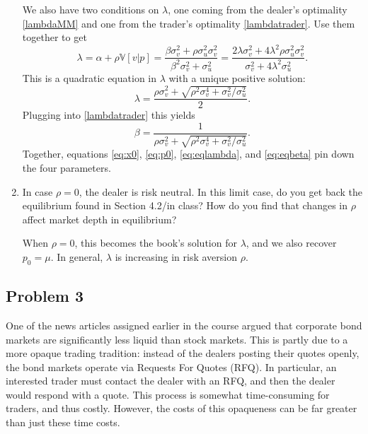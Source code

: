 \documentclass[11pt
, answers
]{exam}
\begin{document}
\begin{enumerate}[label=(\alph*). ]
\begin{solution}
We also have two conditions on $\lambda$, one coming from the dealer's optimality \eqref{lambdaMM} and one from the trader's optimality \eqref{lambdatrader}. Use them together to get
\[
\lambda =  \alpha + \rho \mathbb{V}[v|p] = \frac{\beta \sigma^{2}_{v} + \rho \sigma^{2}_{u} \sigma^{2}_{v}}{\beta^{2}\sigma^{2}_{v}+\sigma^{2}_{u}} = \frac{2\lambda \sigma^{2}_{v}+4\lambda^{2}\rho \sigma^{2}_{u}\sigma^{2}_{v}}{\sigma^{2}_{v}+4\lambda^{2} \sigma^{2}_{u}}.
\]
This is a quadratic equation in $\lambda$ with a unique positive solution:
\begin{equation} \label{eq:eqlambda}
\lambda = \frac{\rho \sigma^{2}_{v} + \sqrt{\rho^{2} \sigma^{4}_{v} + \sigma^{2}_{v}/ \sigma^{2}_{u}}}{2}.
\end{equation}
Plugging into \eqref{lambdatrader} this yields
\begin{equation} \label{eq:eqbeta}
\beta = \frac{1}{\rho \sigma^{2}_{v} + \sqrt{\rho^{2} \sigma^{4}_{v} + \sigma^{2}_{v}/ \sigma^{2}_{u}}}.
\end{equation}
Together, equations \eqref{eq:x0}, \eqref{eq:p0}, \eqref{eq:eqlambda}, and \eqref{eq:eqbeta} pin down the four parameters.

\end{solution}

\item In case $\rho= 0$, the dealer is risk neutral. In this limit case, do you get back the equilibrium found in Section 4.2/in class? How do you find that changes in $\rho$ affect market depth in equilibrium?

\begin{solution}
When $\rho=0$, this becomes the book's solution for $\lambda$, and we also recover $p_{0}=\mu$. In general, $\lambda$ is increasing in risk aversion $\rho$.
\end{solution}

\end{enumerate}



\qquad
\subsection*{Problem 3}

One of the news articles assigned earlier in the course argued that corporate bond markets are significantly less liquid than stock markets. This is partly due to a more opaque trading tradition: instead of the dealers posting their quotes openly, the bond markets operate via Requests For Quotes (RFQ). In particular, an interested trader must contact the dealer with an RFQ, and then the dealer would respond with a quote. This process is somewhat time-consuming for traders, and thus costly. However, the costs of this opaqueness can be far greater than just these time costs.
\end{document}
